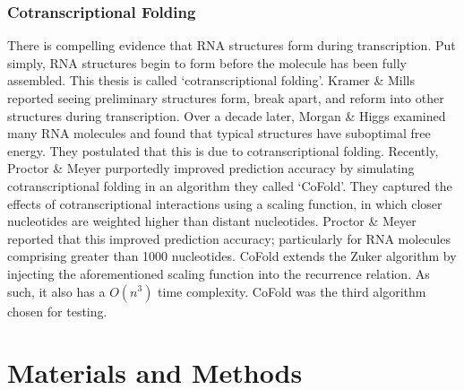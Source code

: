 \documentclass[12pt, a4paper]{article}
\begin{document}
\subsubsection{Cotranscriptional Folding}
There is compelling evidence that RNA structures form during transcription. Put simply, RNA structures begin to form before the molecule has been fully assembled. This thesis is called `cotranscriptional folding'. Kramer \& Mills \cite{kramer1981secondary} reported seeing preliminary structures form, break apart, and reform into other structures during transcription. Over a decade later, Morgan \& Higgs \cite{morgan1996evidence} examined many RNA molecules and found that typical structures have suboptimal free energy. They postulated that this is due to cotranscriptional folding. Recently, Proctor \& Meyer \cite{proctor2013cofold} purportedly improved prediction accuracy by simulating cotranscriptional folding in an algorithm they called `CoFold'. They captured the effects of cotranscriptional interactions using a scaling function, in which closer nucleotides are weighted higher than distant nucleotides. Proctor \& Meyer \cite{proctor2013cofold} reported that this improved prediction accuracy; particularly for RNA molecules comprising greater than 1000 nucleotides. CoFold extends the Zuker algorithm by injecting the aforementioned scaling function into the recurrence relation. As such, it also has a $O(n^3)$ time complexity. CoFold was the third algorithm chosen for testing.

\section{Materials and Methods}
\end{document}
